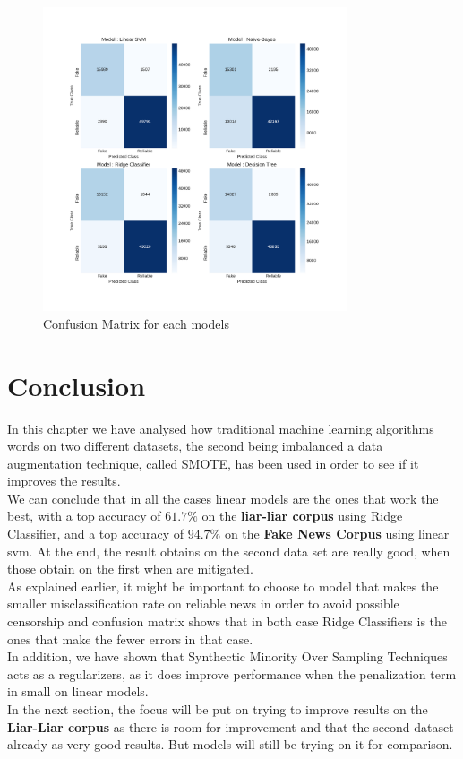 \begin{figure}
 \centering
 \includegraphics[width=0.8\textwidth]{images/chapitre3/test_SMOTE_fake_confMat}
 \caption{Confusion Matrix for each models}
 \label{fig:chap3:confMat3}
\end{figure}
\section{Conclusion}
In this chapter we have analysed how traditional machine learning algorithms words on two different datasets, the second being imbalanced a data augmentation technique, called SMOTE, has been used in order to see if it improves the results. \\

We can conclude that in all the cases linear models are the ones that work the best, with a top accuracy of $61.7\%$ on the \textbf{liar-liar corpus} using Ridge Classifier, and a top accuracy of $94.7\%$ on the \textbf{Fake News Corpus} using linear svm. At the end, the result obtains on the second data set are really good, when those obtain on the first when are mitigated. \\

As explained earlier, it might be important to choose to model that makes the smaller misclassification rate on reliable news in order to avoid possible censorship and confusion matrix shows that in both case Ridge Classifiers is the ones that make the fewer errors in that case. \\

In addition, we have shown that Synthectic Minority Over Sampling Techniques acts as a regularizers, as it does improve performance when the penalization term in small on linear models. \\

In the next section, the focus will be put on trying to improve results on the \textbf{Liar-Liar corpus} as there is room for improvement and that the second dataset already as very good results. But models will still be trying on it for comparison. 